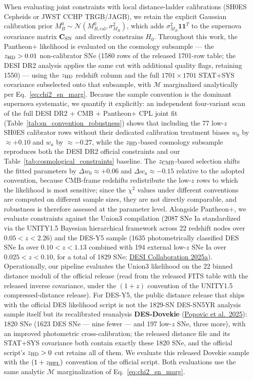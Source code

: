 \documentclass[11pt,letterpaper]{article}
\begin{document}
When evaluating joint constraints with local distance-ladder calibrations (SH0ES Cepheids or JWST CCHP TRGB/JAGB), we retain the explicit Gaussian calibration prior $M_B^0 \sim \mathcal{N}(M_{B,\text{cal}}^0, \sigma_{M_B}^2)$, which adds $\sigma_{M_B}^2 \mathbf{1}\mathbf{1}^T$ to the supernova covariance matrix $\mathbf{C}_{\rm SN}$ and directly constrains $H_0$. Throughout this work, the Pantheon+ likelihood is evaluated on the cosmology subsample --- the $z_{\rm HD} > 0.01$ non-calibrator SNe (1580 rows of the released 1701-row table; the DESI DR2 analysis applies the same cut with additional quality flags, retaining 1550) --- using the $z_{\rm HD}$ redshift column and the full $1701 \times 1701$ STAT+SYS covariance subselected onto that subsample, with $\mathcal{M}$ marginalized analytically per Eq.~\ref{eq:chi2_sn_marg}. Because the sample convention is the dominant supernova systematic, we quantify it explicitly: an independent four-variant scan of the full DESI DR2 + CMB + Pantheon+ CPL joint fit (Table~\ref{tab:sn_convention_robustness}) shows that including the 77 low-$z$ SH0ES calibrator rows without their dedicated calibration treatment biases $w_0$ by $\approx +0.10$ and $w_a$ by $\approx -0.27$, while the $z_{\rm HD}$-based cosmology subsample reproduces both the DESI DR2 official constraints and our Table~\ref{tab:cosmological_constraints} baseline. The $z_{\rm CMB}$-based selection shifts the fitted parameters by $\Delta w_0 \approx +0.06$ and $\Delta w_a \approx -0.15$ relative to the adopted convention, because CMB-frame redshifts redistribute the low-$z$ rows to which the likelihood is most sensitive; since the $\chi^2$ values under different conventions are computed on different sample sizes, they are not directly comparable, and robustness is therefore assessed at the parameter level. Alongside Pantheon+, we evaluate constraints against the Union3 compilation (2087 SNe Ia standardized via the UNITY1.5 Bayesian hierarchical framework across 22 redshift nodes over $0.05 < z < 2.26$) and the DES-Y5 sample (1635 photometrically classified DES SNe Ia over $0.10 < z < 1.13$ combined with 194 external low-$z$ SNe Ia over $0.025 < z < 0.10$, for a total of 1829 SNe; \href{https://arxiv.org/abs/2503.14738}{DESI Collaboration 2025a}). Operationally, our pipeline evaluates the Union3 likelihood on the 22 binned distance moduli of the official release (read from the released FITS table with the released inverse covariance, under the $(1+z)$ convention of the UNITY1.5 compressed-distance release). For DES-Y5, the public distance release that ships with the official DES likelihood script is not the 1829-SN DES-SN5YR analysis sample itself but its recalibrated reanalysis \textbf{DES-Dovekie} (\href{https://arxiv.org/abs/2511.07517}{Popovic et al.\ 2025}): 1820 SNe (1623 DES SNe --- nine fewer --- and 197 low-$z$ SNe, three more), with an improved photometric cross-calibration; the released distance file and its STAT+SYS covariance both contain exactly these 1820 SNe, and the official script's $z_{\rm HD} > 0$ cut retains all of them. We evaluate this released Dovekie sample with the $(1+z_{\rm HEL})$ convention of the official script. Both evaluations use the same analytic $\mathcal{M}$ marginalization of Eq.~\ref{eq:chi2_sn_marg}.
\end{document}
